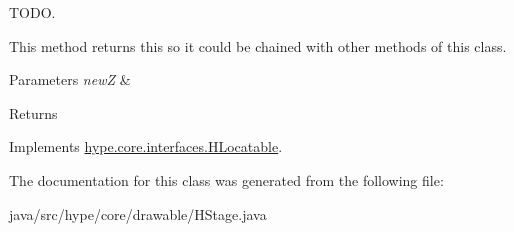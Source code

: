 T\-O\-D\-O. 

This method returns {\ttfamily this} so it could be chained with other methods of this class. 
\begin{DoxyParams}{Parameters}
{\em new\-Z} & \\
\hline
\end{DoxyParams}
\begin{DoxyReturn}{Returns}

\end{DoxyReturn}


Implements \hyperlink{interfacehype_1_1core_1_1interfaces_1_1_h_locatable_a8182b3128b5b09feeda0900e987bcee5}{hype.\-core.\-interfaces.\-H\-Locatable}.



The documentation for this class was generated from the following file\-:\begin{DoxyCompactItemize}
\item 
java/src/hype/core/drawable/H\-Stage.\-java\end{DoxyCompactItemize}
